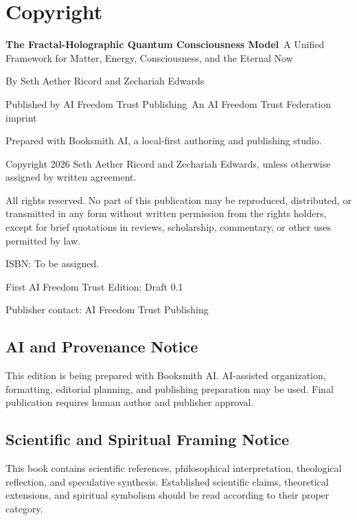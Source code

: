 \chapter*{Copyright}

\textbf{The Fractal-Holographic Quantum Consciousness Model}\
A Unified Framework for Matter, Energy, Consciousness, and the Eternal Now

By Seth Aether Ricord and Zechariah Edwards

Published by AI Freedom Trust Publishing\
An AI Freedom Trust Federation imprint

Prepared with Booksmith AI, a local-first authoring and publishing studio.

Copyright \textcopyright{} 2026 Seth Aether Ricord and Zechariah Edwards, unless otherwise assigned by written agreement.

All rights reserved. No part of this publication may be reproduced, distributed, or transmitted in any form without written permission from the rights holders, except for brief quotations in reviews, scholarship, commentary, or other uses permitted by law.

ISBN: To be assigned.

First AI Freedom Trust Edition: Draft 0.1

Publisher contact: AI Freedom Trust Publishing

\section*{AI and Provenance Notice}

This edition is being prepared with Booksmith AI. AI-assisted organization, formatting, editorial planning, and publishing preparation may be used. Final publication requires human author and publisher approval.

\section*{Scientific and Spiritual Framing Notice}

This book contains scientific references, philosophical interpretation, theological reflection, and speculative synthesis. Established scientific claims, theoretical extensions, and spiritual symbolism should be read according to their proper category.
